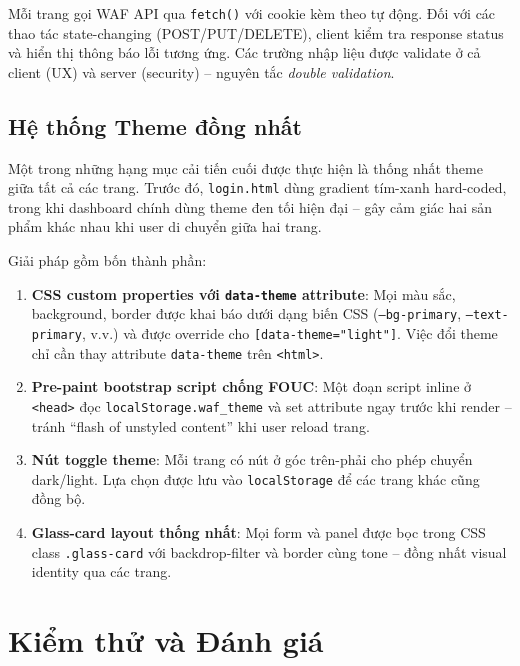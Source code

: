 \documentclass[../DoAn.tex]{subfiles}
\begin{document}
Mỗi trang gọi WAF API qua \texttt{fetch()} với cookie kèm theo tự động.
Đối với các thao tác state-changing (POST/PUT/DELETE), client kiểm tra
response status và hiển thị thông báo lỗi tương ứng. Các trường nhập liệu
được validate ở cả client (UX) và server (security) -- nguyên tắc
\textit{double validation}.

\subsection{Hệ thống Theme đồng nhất}
\label{subsection:4.5.3}

Một trong những hạng mục cải tiến cuối được thực hiện là thống nhất theme
giữa tất cả các trang. Trước đó, \texttt{login.html} dùng gradient tím-xanh
hard-coded, trong khi dashboard chính dùng theme đen tối hiện đại -- gây
cảm giác hai sản phẩm khác nhau khi user di chuyển giữa hai trang.

Giải pháp gồm bốn thành phần:

\begin{enumerate}[leftmargin=*]
    \item \textbf{CSS custom properties với \texttt{data-theme} attribute}:
    Mọi màu sắc, background, border được khai báo dưới dạng biến CSS
    (\texttt{--bg-primary}, \texttt{--text-primary}, v.v.) và được override
    cho \texttt{[data-theme="light"]}. Việc đổi theme chỉ cần thay attribute
    \texttt{data-theme} trên \texttt{<html>}.

    \item \textbf{Pre-paint bootstrap script chống FOUC}: Một đoạn script
    inline ở \texttt{<head>} đọc \texttt{localStorage.waf\_theme} và set
    attribute ngay trước khi render -- tránh ``flash of unstyled content''
    khi user reload trang.

    \item \textbf{Nút toggle theme}: Mỗi trang có nút ở góc trên-phải cho
    phép chuyển dark/light. Lựa chọn được lưu vào \texttt{localStorage}
    để các trang khác cũng đồng bộ.

    \item \textbf{Glass-card layout thống nhất}: Mọi form và panel được
    bọc trong CSS class \texttt{.glass-card} với backdrop-filter và border
    cùng tone -- đồng nhất visual identity qua các trang.
\end{enumerate}

\section{Kiểm thử và Đánh giá}
\label{section:4.6}
\end{document}
